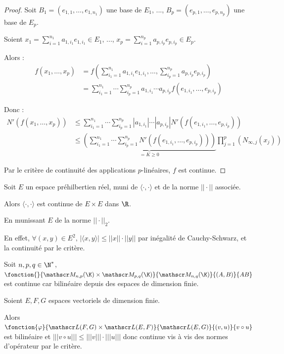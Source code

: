 \begin{proof}
    Soit $B_1 = (e_{1, 1}, \ldots, e_{1, n_1})$ une base de $E_1$, ..., $B_p = (e_{p, 1}, \ldots, e_{p, n_p})$ une base de $E_p$.

    Soient $\displaystyle x_1 = \sum_{i=1}^{n_1} a_{1, i_1} e_{1, i_1} \in E_1$, ..., $\displaystyle x_p = \sum_{i=1}^{n_p} a_{p, i_p} e_{p, i_p} \in E_p$.

    Alors :
    \begin{align*}
        f(x_1, \ldots, x_p) & = f\left( \sum_{i_1=1}^{n_1} a_{1, i_1} e_{1, i_1}, \ldots, \sum_{i_p=1}^{n_p} a_{p, i_p} e_{p, i_p} \right) \\
        & = \sum_{i_1=1}^{n_1} \cdots \sum_{i_p=1}^{n_p} a_{1, i_1} \cdots a_{p, i_p} f(e_{1, i_1}, \ldots, e_{p, i_p}) 
    \end{align*}

    Donc :
    \begin{align*}
        N'(f(x_1, \ldots, x_p)) & \leqslant \sum_{i_1=1}^{n_1} \cdots \sum_{i_p=1}^{n_p} |a_{1, i_1}| \cdots |a_{p, i_p}| N'(f(e_{1, i_1}, \ldots, e_{p, i_p})) \\
        & \leqslant \underbrace{\left( \sum_{i_1=1}^{n_1} \cdots \sum_{i_p=1}^{n_p} N'(f(e_{1, i_1}, \ldots, e_{p, i_p})) \right)}_{ = K \geqslant 0} \prod_{j=1}^p \left( N_{\infty, j}(x_j) \right)
    \end{align*}

    Par le critère de continuité des applications $p$-linéaires, $f$ est continue.
\end{proof}

\begin{exemple}
    Soit $E$ un espace préhilbertien réel, muni de $\langle \cdot, \cdot \rangle$ et de la norme $||\cdot||$ associée.

    Alors $\langle \cdot, \cdot\rangle$ est continue de $E \times E$ dans $\R$. 

    En munissant $E$ de la norme $||\cdot||_2$. 

    En effet, $\forall (x, y) \in E^2, \, |\langle x, y\rangle| \leqslant ||x|| \cdot ||y||$ par inégalité de Cauchy-Schwarz,
    et la continuité par le critère. 

    \lvspace Soit $n, p, q \in \N^*$, $\fonction{}{\mathscr M_{n, p}(\K) \times \mathscr M_{p, q}(\K)}{\mathscr M_{n, q}(\K)}{(A, B)}{AB}$ est
    continue car bilinéaire depuis des espaces de dimension finie. 


    \lvspace Soient $E, F, G$ espaces vectoriels de dimension finie.
    
    Alors $\fonction{\varphi}{\mathscr L(F, G) \times \mathscr L(E, F)}{\mathscr L(E, G)}{(v, u)}{v \circ u}$ est bilinéaire
    et $||| v \circ u||| \leqslant |||v||| \cdot |||u|||$ donc continue vis à vis des normes d'opérateur par 
    le critère. 
\end{exemple}

